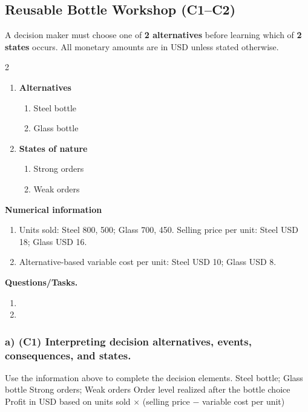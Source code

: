 \subsection{Reusable Bottle Workshop (C1--C2)}
\label{sec:problem3-reusable-bottle-workshop-c1-c2}
A decision maker must choose one of \textbf{2 alternatives} before learning which of \textbf{2 states} occurs. All monetary amounts are in USD unless stated otherwise.
\begin{multicols}{2}
\begin{enumerate}[label=\arabic*.]
 \item \textbf{Alternatives}
 \begin{enumerate}[label=\roman*)]
  \item Steel bottle
  \item Glass bottle
 \end{enumerate}
 \item \textbf{States of nature}
 \begin{enumerate}[label=\roman*)]
  \item Strong orders
  \item Weak orders
 \end{enumerate}
\end{enumerate}
\end{multicols}
 \textbf{Numerical information}
 \begin{enumerate}[label=\roman*)]
  \item Units sold: Steel 800, 500; Glass 700, 450. Selling price per unit: Steel USD 18; Glass USD 16.
  \item Alternative-based variable cost per unit: Steel USD 10; Glass USD 8.
 \end{enumerate}

\textbf{Questions/Tasks.}
\begin{enumerate}[label=\textbf{\alph*)}]
 \item {}
 \item {}
\end{enumerate}
\subsubsection*{a) \textbf{(C1)} Interpreting decision alternatives, events, consequences, and states.}
\label{subsec:problem3-reusable-bottle-workshop-c1}
Use the information above to complete the decision elements.
\DecisionElementsTable
{Steel bottle; Glass bottle}
{Strong orders; Weak orders}
{Order level realized after the bottle choice}
{Profit in USD based on units sold $\times$ (selling price $-$ variable cost per unit)}
